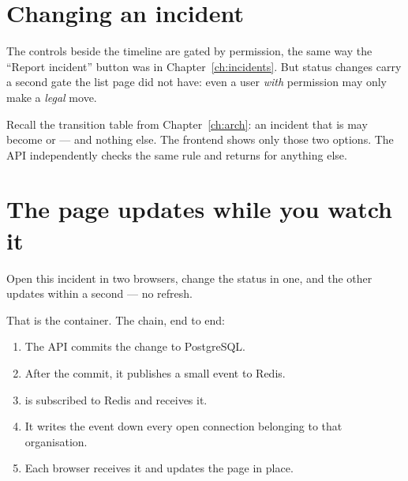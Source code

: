 
\section{Changing an incident}

The controls beside the timeline are gated by permission, the same way the
``Report incident'' button was in Chapter~\ref{ch:incidents}. But status changes
carry a second gate the list page did not have: even a user \emph{with}
permission may only make a \emph{legal} move.

Recall the transition table from Chapter~\ref{ch:arch}: an incident that is
 may become  or  --- and nothing
else. The frontend shows only those two options. The API independently checks
the same rule and returns  for anything else.


\section{The page updates while you watch it}

Open this incident in two browsers, change the status in one, and the other
updates within a second --- no refresh.

That is the  container. The chain, end to end:

\begin{enumerate}[leftmargin=1.5cm]
\item The API commits the change to PostgreSQL.
\item After the commit, it publishes a small event to Redis.
\item {} is subscribed to Redis and receives it.
\item It writes the event down every open connection belonging to that
  organisation.
\item Each browser receives it and updates the page in place.
\end{enumerate}

